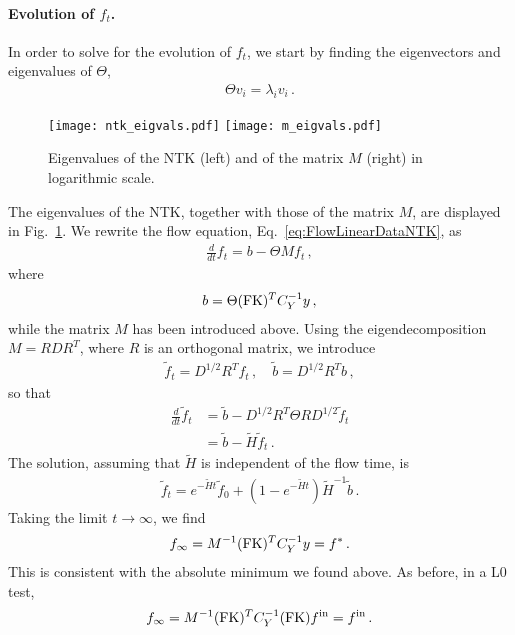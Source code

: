 \documentclass[11pt]{article}
\begin{document}
\paragraph{Evolution of $f_t$.}
In order to solve for the evolution of $f_t$, we start by finding the eigenvectors and eigenvalues of $\Theta$,
\begin{align}
    \label{eq:ThetaEigensystem}
    \Theta v_i = \lambda_i v_i\,.
\end{align}
\begin{figure}[!t]
  \centering
  \texttt{[image: ntk\_eigvals.pdf]}
  \texttt{[image: m\_eigvals.pdf]}
  \caption{Eigenvalues of the NTK (left) and of the matrix $M$ (right) in 
    logarithmic scale.}
  \label{fig:NTKEigVals}
\end{figure}
The eigenvalues of the NTK, together with those of the matrix $M$, are displayed in
Fig.~\ref{fig:NTKEigVals}. We rewrite the flow equation, Eq.~\ref{eq:FlowLinearDataNTK}, as
\begin{align}
    \label{eq:ft_b_ThetaMft}
    \frac{d}{dt} f_t = b - \Theta M f_t\, , 
\end{align}
where 
\begin{align}
    \label{eq:Defb}
    b = \Theta (\mathrm{FK})^T C_Y^{-1} y\, ,
\end{align}
while the matrix $M$ has been introduced above.  Using the eigendecomposition $M = R D R^T$, 
where $R$ is an orthogonal matrix, we introduce 
\begin{align}
    \label{eq:RotatedF}
    \tilde{f}_t = D^{1/2} R^T f_t\, , \quad \tilde{b} = D^{1/2} R^T b\, ,
\end{align}
so that 
\begin{align}
    \label{eq:EvolutionRotatedF}
    \frac{d}{dt} \tilde{f}_t &= \tilde{b} - D^{1/2} R^T \Theta R D^{1/2} \tilde{f}_t \\
        &= \tilde{b} - \tilde{H} \tilde{f}_t\, .
\end{align}
The solution, assuming that $\tilde{H}$ is independent of the flow time, is
\begin{align}
    \label{eq:FlowSolutionInFtilde}
    \tilde{f}_t = e^{-\tilde{H}t} \tilde{f}_0 + 
        \left(1 - e^{-\tilde{H}t}\right) \tilde{H}^{-1} \tilde{b}\, .
\end{align}
Taking the limit $t\to\infty$, we find
\begin{align}
    \label{eq:InfiniteTrainingF}
    f_\infty = M^{-1} (\mathrm{FK})^T C_Y^{-1} y = f^*\, .
\end{align}
This is consistent with the absolute minimum we found above. 
As before, in a L0 test, 
\begin{align}
    f_\infty = M^{-1} (\mathrm{FK})^T C_Y^{-1} (\mathrm{FK}) f^{\mathrm{in}} = f^{\mathrm{in}}\, .
\end{align}
\end{document}

